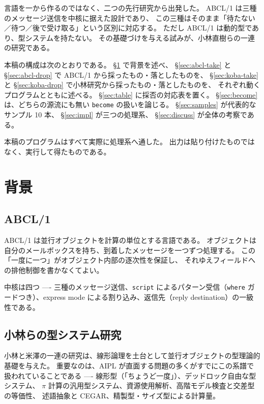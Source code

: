 \documentclass[11pt,a4paper]{ltjsarticle}
\theoremstyle{definition}
\theoremstyle{remark}
\begin{document}
言語を一から作るのではなく、二つの先行研究から出発した。
ABCL/1 は三種のメッセージ送信を中核に据えた設計であり、
この三種はそのまま「待たない／待つ／後で受け取る」という区別に対応する。
ただし ABCL/1 は動的型であり、型システムを持たない。
その基礎づけを与える試みが、小林直樹らの一連の研究である。

本稿の構成は次のとおりである。
\S\ref{sec:bg} で背景を述べ、
\S\ref{sec:abcl-take} と \S\ref{sec:abcl-drop} で ABCL/1 から採ったもの・落としたものを、
\S\ref{sec:koba-take} と \S\ref{sec:koba-drop} で小林研究から採ったもの・落としたものを、
それぞれ動くプログラムとともに述べる。
\S\ref{sec:table} に採否の対応表を置く。
\S\ref{sec:become} は、どちらの源流にも無い \texttt{become} の扱いを論じる。
\S\ref{sec:samples} が代表的なサンプル 10 本、
\S\ref{sec:impl} が三つの処理系、
\S\ref{sec:discuss} が全体の考察である。

本稿のプログラムはすべて実際に処理系へ通した。
出力は貼り付けたものではなく、実行して得たものである。

\section{背景}
\label{sec:bg}

\subsection{ABCL/1}

ABCL/1 は並行オブジェクトを計算の単位とする言語である。
オブジェクトは自分のメールボックスを持ち、到着したメッセージを一つずつ処理する。
この「一度に一つ」がオブジェクト内部の逐次性を保証し、
それゆえフィールドへの排他制御を書かなくてよい。

中核は四つ ---- 三種のメッセージ送信、\texttt{script} によるパターン受信（\texttt{where}
ガードつき）、express mode による割り込み、返信先（reply destination）の一級性である。

\subsection{小林らの型システム研究}

小林と米澤の一連の研究は、線形論理を土台として並行オブジェクトの型理論的基礎を与えた。
重要なのは、AIPL が直面する問題の多くがすでにこの系譜で扱われていることである
---- 線形型（「ちょうど一度」）、デッドロック自由な型システム、
$\pi$ 計算の汎用型システム、資源使用解析、高階モデル検査と交差型の等価性、
述語抽象と CEGAR、精製型・サイズ型による計算量。
\end{document}
